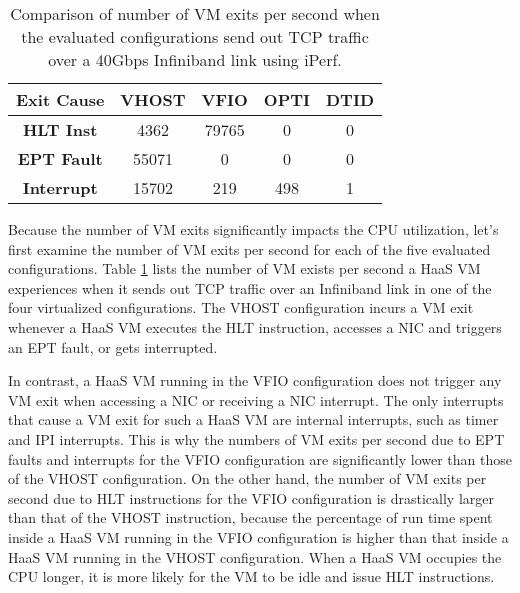 \begin{table}
\renewcommand{\arraystretch}{1.2}
\small
\begin{center}
\begin{tabular}{|c|c|c|c|c|} \hline
{\bf Exit Cause} & {\bf VHOST } & {\bf VFIO} & {\bf OPTI} & {\bf DTID} \\ \hline
 {\bf HLT Inst}    & 4362  & 79765 & 0    & 0    \\ \hline
 {\bf EPT Fault}  & 55071 & 0     & 0    & 0    \\ \hline
{\bf Interrupt}   & 15702 & 219   & 498  & 1    \\ \hline
\end{tabular}
\end{center}
\vspace{-0.1in}
\caption{Comparison of number of VM exits per second when the evaluated 
configurations send out TCP traffic over a
40Gbps Infiniband link using iPerf.}
\label{tab:vm_exit}
\vspace{-0.1in}
\end{table}

Because the number of VM exits significantly impacts the CPU utilization, 
let's first examine the number of VM exits per second for each of the five 
evaluated configurations. 
Table \ref{tab:vm_exit}  lists the number of VM exists per second a HaaS VM experiences 
when it sends out TCP traffic over an Infiniband link in one of the four virtualized 
configurations. 
The VHOST configuration incurs a VM exit whenever a HaaS VM executes the HLT instruction,
accesses a NIC and triggers an EPT fault, or gets interrupted. 

In contrast, a HaaS VM running in the VFIO configuration does not trigger any VM exit when
accessing a NIC or receiving a NIC interrupt.
The only interrupts that cause a VM exit for such a HaaS VM are internal interrupts, such
as timer and IPI interrupts.
This is why the numbers of VM exits per second due to EPT faults and interrupts  for the VFIO 
configuration are significantly lower than those of the VHOST configuration.
On the other hand, the number of VM exits per second due to HLT instructions for the VFIO configuration
is drastically larger than that of the VHOST instruction, because 
the percentage of run time spent inside a HaaS VM running in the VFIO configuration 
is higher than that inside a HaaS VM running in the VHOST configuration.
When a HaaS VM occupies the CPU longer, it is more likely for the VM to be idle and issue HLT instructions.

